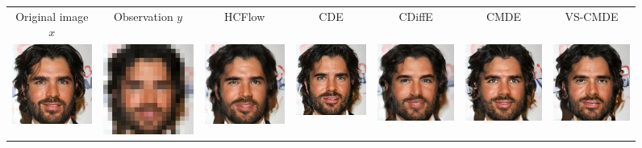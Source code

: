 \begin{figure}
    \begin{center}
    \begingroup
    \setlength{\tabcolsep}{0pt}
 
    \begin{tabular}{ccccccc}
        Original image $x$ & Observation $ y$ & HCFlow & CDE & CDiffE & CMDE & VS-CMDE \\

        \includegraphics[width=.14\textwidth]{Chapter2/samples/extended_results/super_resolution/2/x.png} &   
        \includegraphics[width=.14\textwidth]{Chapter2/samples/extended_results/super_resolution/2/y.png} &
        \includegraphics[width=.14\textwidth]{Chapter2/samples/extended_results/super_resolution/2/HCFLOW.png} &
        \includegraphics[width=.14\textwidth]{Chapter2/samples/extended_results/super_resolution/2/CDE.png} & 
        \includegraphics[width=.14\textwidth]{Chapter2/samples/extended_results/super_resolution/2/CDiffE.png} &
        \includegraphics[width=.14\textwidth]{Chapter2/samples/extended_results/super_resolution/2/cmde.png} &
        \includegraphics[width=.14\textwidth]{Chapter2/samples/extended_results/super_resolution/2/VS-CMDE.png}\\
        

\end{tabular}
\end{center}
\end{figure}
